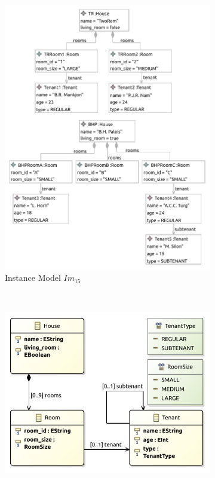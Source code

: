 \begin{figure}[p]
    \centering
    \begin{subfigure}{0.98\textwidth}
        \centering
        \includegraphics{images/06_application/instance_model/step15.pdf}
        \caption{Instance Model $Im_{15}$}
        \label{fig:application:building_the_model:living_rooms:ecore:instance_model}
    \end{subfigure}
    \\
    \begin{subfigure}{0.98\textwidth}
        \centering
        \includegraphics{images/06_application/type_model/step15.pdf}

\end{subfigure}
\end{figure}
